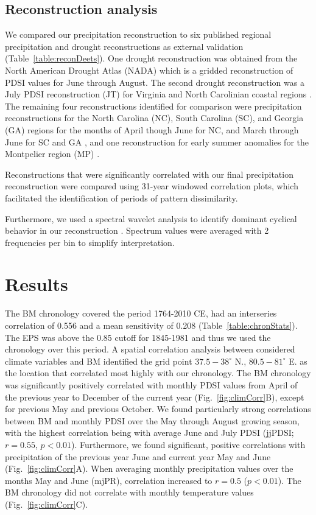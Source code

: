 \subsection{Reconstruction analysis}

We compared our precipitation reconstruction to six published regional
precipitation and drought reconstructions as external validation
(Table~\ref{table:reconDeets}). One drought reconstruction was obtained
from the North American Drought Atlas (NADA) \cite{cook1999drought} which
is a gridded reconstruction of PDSI values for June through August. The
second drought reconstruction was a July PDSI reconstruction (JT) for
Virginia and North Carolinian coastal regions \cite{stahle1998lost}. The
remaining four reconstructions identified for comparison were
precipitation reconstructions for the North Carolina (NC), South Carolina
(SC), and Georgia (GA) regions for the months of April though June for NC,
and March through June for SC and GA \cite{stahle1992reconstruction},
and one reconstruction for early summer anomalies for the Montpelier
region (MP) \cite{druckenbrod2003late}.

Reconstructions that were significantly correlated with our final
precipitation reconstruction were compared using 31-year windowed
correlation plots, which facilitated the identification of periods of
pattern dissimilarity.

Furthermore, we used a spectral wavelet analysis to
identify dominant cyclical behavior in our reconstruction
\cite{torrence1998practical}. Spectrum values were averaged with 2
frequencies per bin to simplify interpretation.


\section{Results}

The BM chronology covered the period 1764-2010 CE, had an
interseries correlation of 0.556 and a mean sensitivity of 0.208
(Table~\ref{table:chronStats}). The EPS was above the 0.85 cutoff for
1845-1981 and thus we used the chronology over this period. A spatial
correlation analysis between considered climate variables and BM identified the grid point $37.5-38^{\circ}$ N.,
$80.5-81^{\circ}$ E. as the location that correlated most highly with our
chronology. The BM chronology was significantly positively correlated with monthly
PDSI values from April of the previous year to December of the current
year (Fig.~\ref{fig:climCorr}B), except for previous May and previous
October. We found particularly strong correlations between BM
and monthly PDSI over the May through August growing season, with the
highest correlation being with average June and July PDSI (jjPDSI;
$r=0.55$, $p<0.01$). Furthermore, we found significant, positive
correlations with precipitation of the previous year June and current
year May and June (Fig.~\ref{fig:climCorr}A). When averaging monthly
precipitation values over the months May and June (mjPR), correlation
increased to $r=0.5$ ($p<0.01$). The BM chronology did not correlate
with monthly temperature values (Fig.~\ref{fig:climCorr}C).

